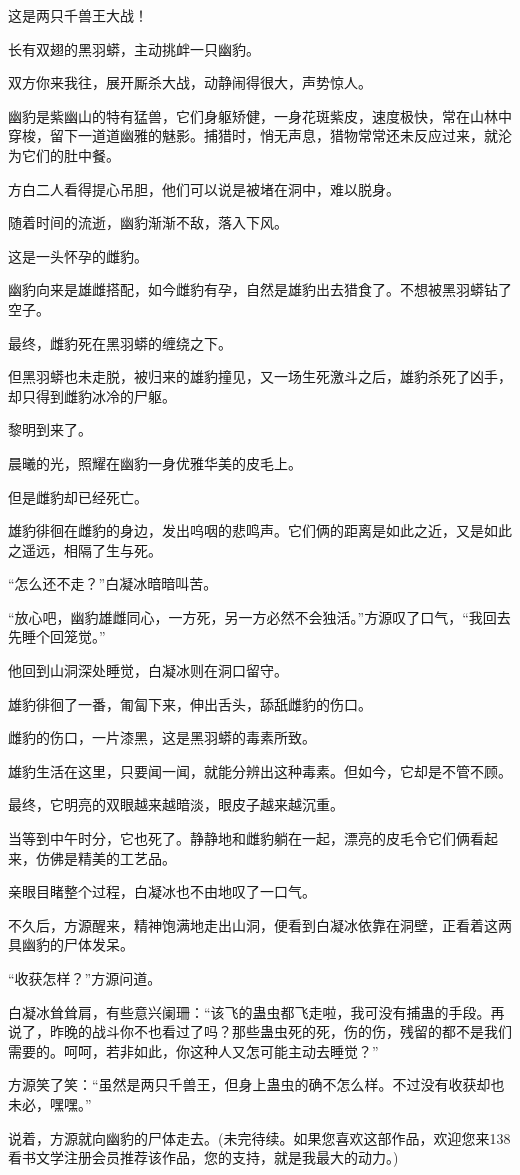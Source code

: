 \begin{this_body}
这是两只千兽王大战！

长有双翅的黑羽蟒，主动挑衅一只幽豹。

双方你来我往，展开厮杀大战，动静闹得很大，声势惊人。

幽豹是紫幽山的特有猛兽，它们身躯矫健，一身花斑紫皮，速度极快，常在山林中穿梭，留下一道道幽雅的魅影。捕猎时，悄无声息，猎物常常还未反应过来，就沦为它们的肚中餐。

方白二人看得提心吊胆，他们可以说是被堵在洞中，难以脱身。

随着时间的流逝，幽豹渐渐不敌，落入下风。

这是一头怀孕的雌豹。

幽豹向来是雄雌搭配，如今雌豹有孕，自然是雄豹出去猎食了。不想被黑羽蟒钻了空子。

最终，雌豹死在黑羽蟒的缠绕之下。

但黑羽蟒也未走脱，被归来的雄豹撞见，又一场生死激斗之后，雄豹杀死了凶手，却只得到雌豹冰冷的尸躯。

黎明到来了。

晨曦的光，照耀在幽豹一身优雅华美的皮毛上。

但是雌豹却已经死亡。

雄豹徘徊在雌豹的身边，发出呜咽的悲鸣声。它们俩的距离是如此之近，又是如此之遥远，相隔了生与死。

“怎么还不走？”白凝冰暗暗叫苦。

“放心吧，幽豹雄雌同心，一方死，另一方必然不会独活。”方源叹了口气，“我回去先睡个回笼觉。”

他回到山洞深处睡觉，白凝冰则在洞口留守。

雄豹徘徊了一番，匍匐下来，伸出舌头，舔舐雌豹的伤口。

雌豹的伤口，一片漆黑，这是黑羽蟒的毒素所致。

雄豹生活在这里，只要闻一闻，就能分辨出这种毒素。但如今，它却是不管不顾。

最终，它明亮的双眼越来越暗淡，眼皮子越来越沉重。

当等到中午时分，它也死了。静静地和雌豹躺在一起，漂亮的皮毛令它们俩看起来，仿佛是精美的工艺品。

亲眼目睹整个过程，白凝冰也不由地叹了一口气。

不久后，方源醒来，精神饱满地走出山洞，便看到白凝冰依靠在洞壁，正看着这两具幽豹的尸体发呆。

“收获怎样？”方源问道。

白凝冰耸耸肩，有些意兴阑珊：“该飞的蛊虫都飞走啦，我可没有捕蛊的手段。再说了，昨晚的战斗你不也看过了吗？那些蛊虫死的死，伤的伤，残留的都不是我们需要的。呵呵，若非如此，你这种人又怎可能主动去睡觉？”

方源笑了笑：“虽然是两只千兽王，但身上蛊虫的确不怎么样。不过没有收获却也未必，嘿嘿。”

说着，方源就向幽豹的尸体走去。(未完待续。如果您喜欢这部作品，欢迎您来138看书文学注册会员推荐该作品，您的支持，就是我最大的动力。)

\end{this_body}

